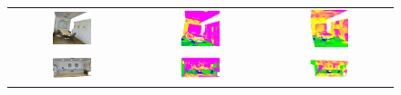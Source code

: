 \begin{figure}[h!]
\begin{tabular}{ccc}
            \includegraphics[width=0.33\textwidth, height=0.16\textheight]{images/seg_output/s3dis_DE/S3DIS_2_RGB.pdf} &
            \includegraphics[width=0.33\textwidth, height=0.16\textheight]{images/seg_output/s3dis_DE/S3DIS_2_Pred.pdf}&
            \includegraphics[width=0.33\textwidth, height=0.16\textheight]{images/seg_output/s3dis_DE/ocroom_1.pdf} \\
            
            \includegraphics[width=0.33\textwidth, height=0.16\textheight]{images/seg_output/s3dis_DE/S3DIS_3_RGB.pdf} &
            \includegraphics[width=0.33\textwidth, height=0.16\textheight]{images/seg_output/s3dis_DE/S3DIS_3_Pred.pdf}&
            \includegraphics[width=0.33\textwidth, height=0.16\textheight]{images/seg_output/s3dis_DE/opantry_1.pdf} \\


\end{tabular}
\end{figure}
